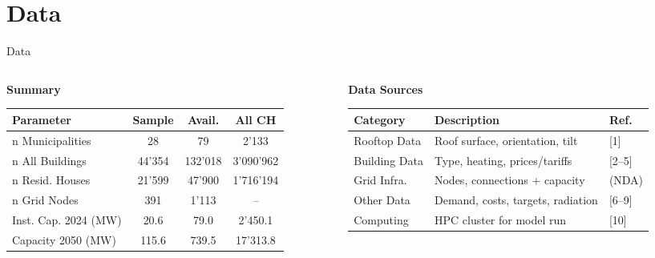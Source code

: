 \documentclass[10pt, aspectratio=169]{beamer}
\begin{document}
\section{Data}

\begin{frame}{Data}

\begin{columns}[t]
\begin{column}{0.48\textwidth}

  \centering\textbf{Summary}\\
  \vspace{0.2cm}
  {\scriptsize
  \setlength{\tabcolsep}{3.5pt}
  \renewcommand{\arraystretch}{1.15}
  \begin{tabular}{l c c c}
    \hline
    \textbf{Parameter} & \textbf{Sample} & \textbf{Avail.} & \textbf{All CH} \\
    \hline
    n Municipalities         & \textcolor[RGB]{200,50,50}{28}     & 79      & 2'133     \\
    n All Buildings          & 44'354 & 132'018 & 3'090'962 \\
    n Resid. Houses          & \textcolor[RGB]{200,50,50}{21'599} & 47'900  & 1'716'194 \\
    n Grid Nodes             & 391    & 1'113   & --        \\
    Inst. Cap. 2024 (MW)     & 20.6   & 79.0    & 2'450.1   \\
    Capacity 2050 (MW)       & 115.6  & 739.5   & 17'313.8  \\
    \hline
  \end{tabular}
  }

\end{column}
\begin{column}{0.48\textwidth}

  \centering\textbf{Data Sources}\\
  \vspace{0.2cm}
  {\scriptsize
  \setlength{\tabcolsep}{3.5pt}
  \renewcommand{\arraystretch}{1.15}
  \begin{tabular}{l l l}
    \hline
    \textbf{Category} & \textbf{Description} & \textbf{Ref.} \\
    \hline
    Rooftop Data      & Roof surface, orientation, tilt             & [1]     \\
    Building Data     & Type, heating, prices/tariffs               & [2--5]  \\
    Grid Infra.       & Nodes, connections + capacity               & (NDA)   \\
    Other Data        & Demand, costs, targets, radiation           & [6--9]  \\
    Computing         & HPC cluster for model run                   & [10]    \\
    \hline
  \end{tabular}
  \vspace{0.2cm}
  }


\end{column}
\end{columns}
\end{frame}
\end{document}
